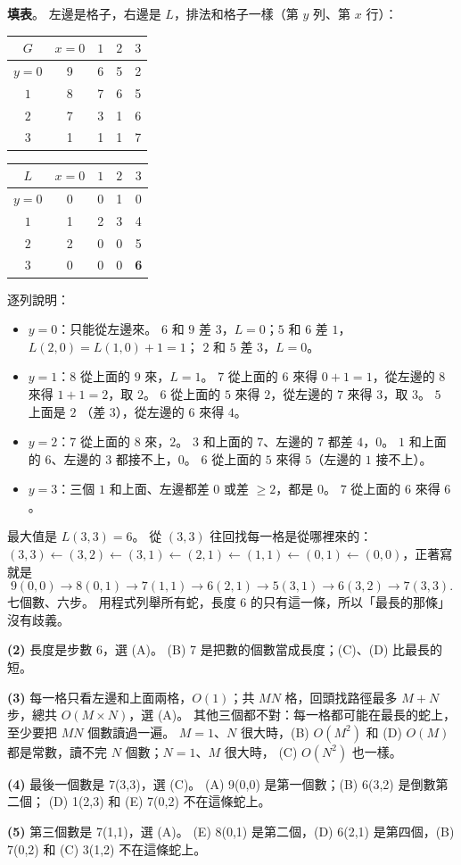 \begin{pastsoln}
\textbf{填表}。 左邊是格子，右邊是 $L$，排法和格子一樣（第 $y$ 列、第 $x$ 行）：
\begin{center}
\begin{tabular}{c|cccc}
$G$ & $x{=}0$ & $1$ & $2$ & $3$ \\ \hline
$y{=}0$ & 9 & 6 & 5 & 2 \\
$1$ & 8 & 7 & 6 & 5 \\
$2$ & 7 & 3 & 1 & 6 \\
$3$ & 1 & 1 & 1 & 7 \\
\end{tabular}
\qquad
\begin{tabular}{c|cccc}
$L$ & $x{=}0$ & $1$ & $2$ & $3$ \\ \hline
$y{=}0$ & 0 & 0 & 1 & 0 \\
$1$ & 1 & 2 & 3 & 4 \\
$2$ & 2 & 0 & 0 & 5 \\
$3$ & 0 & 0 & 0 & \textbf{6} \\
\end{tabular}
\end{center}
逐列說明：
\begin{itemize}
\item $y = 0$：只能從左邊來。 $6$ 和 $9$ 差 $3$，$L = 0$；$5$ 和 $6$ 差 $1$，$L(2,0) = L(1,0) + 1 = 1$；
$2$ 和 $5$ 差 $3$，$L = 0$。
\item $y = 1$：$8$ 從上面的 $9$ 來，$L = 1$。 $7$ 從上面的 $6$ 來得 $0 + 1 = 1$，從左邊的 $8$ 來得
$1 + 1 = 2$，取 $2$。 $6$ 從上面的 $5$ 來得 $2$，從左邊的 $7$ 來得 $3$，取 $3$。 $5$ 上面是 $2$
（差 $3$），從左邊的 $6$ 來得 $4$。
\item $y = 2$：$7$ 從上面的 $8$ 來，$2$。 $3$ 和上面的 $7$、左邊的 $7$ 都差 $4$，$0$。 $1$ 和上面的
$6$、左邊的 $3$ 都接不上，$0$。 $6$ 從上面的 $5$ 來得 $5$（左邊的 $1$ 接不上）。
\item $y = 3$：三個 $1$ 和上面、左邊都差 $0$ 或差 $\ge 2$，都是 $0$。 $7$ 從上面的 $6$ 來得 $6$。
\end{itemize}

最大值是 $L(3, 3) = 6$。 從 $(3, 3)$ 往回找每一格是從哪裡來的：$(3,3) \leftarrow (3,2) \leftarrow
(3,1) \leftarrow (2,1) \leftarrow (1,1) \leftarrow (0,1) \leftarrow (0,0)$，正著寫就是
\[
9(0,0) \to 8(0,1) \to 7(1,1) \to 6(2,1) \to 5(3,1) \to 6(3,2) \to 7(3,3).
\]
七個數、六步。 用程式列舉所有蛇，長度 $6$ 的只有這一條，所以「最長的那條」沒有歧義。

\textbf{(2)} 長度是步數 $6$，選 (A)。 (B) 7 是把數的個數當成長度；(C)、(D) 比最長的短。

\textbf{(3)} 每一格只看左邊和上面兩格，$O(1)$；共 $MN$ 格，回頭找路徑最多 $M + N$ 步，總共
$O(M \times N)$，選 (A)。 其他三個都不對：每一格都可能在最長的蛇上，至少要把 $MN$ 個數讀過一遍。
$M = 1$、$N$ 很大時，(B) $O(M^2)$ 和 (D) $O(M)$ 都是常數，讀不完 $N$ 個數；$N = 1$、$M$ 很大時，
(C) $O(N^2)$ 也一樣。

\textbf{(4)} 最後一個數是 7(3,3)，選 (C)。 (A) 9(0,0) 是第一個數；(B) 6(3,2) 是倒數第二個；
(D) 1(2,3) 和 (E) 7(0,2) 不在這條蛇上。

\textbf{(5)} 第三個數是 7(1,1)，選 (A)。 (E) 8(0,1) 是第二個，(D) 6(2,1) 是第四個，(B) 7(0,2)
和 (C) 3(1,2) 不在這條蛇上。
\end{pastsoln}
